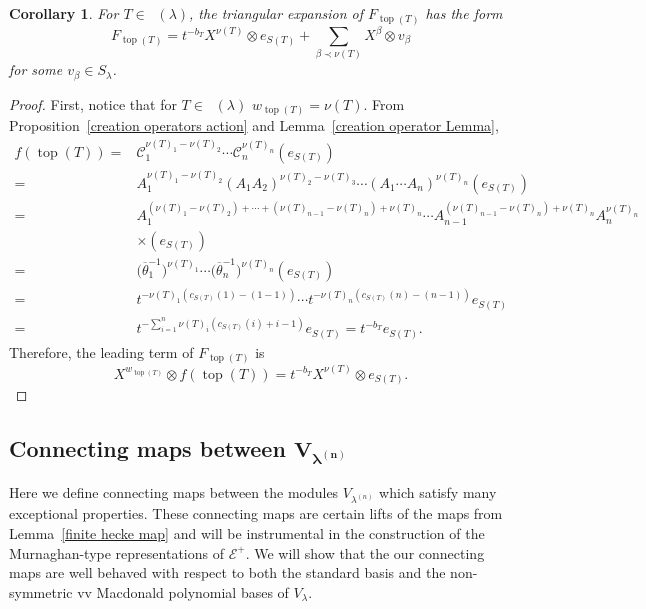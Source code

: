 \documentclass[pdftex]{sigma}
\numberwithin{equation}{section}
\newtheorem{Corollary}[Theorem]{Corollary}
\theoremstyle{definition}
\DeclareMathOperator{\RYT}{\mathrm{RYT}_{\geq 0}}
\DeclareMathOperator{\Top}{\mathrm{top}}
\begin{document}
\begin{Corollary}\label{triangular expansion of top element}
 For $T \in \RYT(\lambda)$, the triangular expansion of $F_{\Top(T)}$ has the form
 \[
 F_{\Top(T)}= t^{-b_T}X^{\nu(T)}\otimes e_{S(T)} + \sum_{\beta \prec \nu(T)} X^{\beta} \otimes v_{\beta}
 \]
 for some $v_{\beta} \in S_\lambda$.
\end{Corollary}
\begin{proof}
 First, notice that for $T \in \RYT(\lambda)$
 $w_{\Top(T)} = \nu(T)$. From Proposition~\ref{creation operators action} and Lemma~\ref{creation operator Lemma},
 \begin{align*}
 f(\Top(T)) ={}& \mathscr{C}_1^{\nu(T)_1 - \nu(T)_2}\cdots \mathscr{C}_n^{\nu(T)_n}(e_{S(T)}) \\
 ={}& A_1^{\nu(T)_1 - \nu(T)_2}(A_1A_2)^{\nu(T)_2-\nu(T)_3}\cdots (A_1\cdots A_n)^{\nu(T)_n}(e_{S(T)}) \\
 ={}& A_1^{(\nu(T)_1 - \nu(T)_2)+\cdots +(\nu(T)_{n-1}-\nu(T)_{n}) + \nu(T)_{n}}\cdots A_{n-1}^{(\nu(T)_{n-1}-\nu(T)_{n}) + \nu(T)_{n}}A_n^{\nu(T)_n}\\
 &\times (e_{S(T)}) \\
 ={}& \bigl(\overline{\theta}_1^{-1}\bigr)^{\nu(T)_1 }\cdots \bigl(\overline{\theta}_n^{-1}\bigr)^{\nu(T)_n} (e_{S(T)}) \\
 ={}& t^{-\nu(T)_1(c_{S(T)}(1)-(1-1))}\cdots t^{-\nu(T)_n(c_{S(T)}(n)-(n-1))} e_{S(T)} \\
 ={}& t^{-\sum_{i=1}^{n} \nu(T)_i( c_{S(T)}(i) + i-1)}e_{S(T)}
 = t^{-b_T} e_{S(T)}.
 \end{align*}
 Therefore, the leading term of $F_{\Top(T)}$ is
 \[
 X^{w_{\Top(T)}} \otimes f(\Top(T)) =t^{-b_T} X^{\nu(T)} \otimes e_{S(T)}.\tag*{\qed}
 \]\renewcommand{\qed}{}
\end{proof}

\subsection[Connecting maps between V\_lambda\^{}(n)]{Connecting maps between $\boldsymbol{V_{\lambda^{(n)}}}$}

Here we define connecting maps between the modules $V_{\lambda^{(n)}}$ which satisfy many exceptional properties. These connecting maps are certain lifts of the maps  from Lemma~\ref{finite hecke map} and will be instrumental in the construction of the Murnaghan-type representations of $\mathcal{E}^{+}$. We will show that the our connecting maps are well behaved with respect to both the standard basis and the non-symmetric vv Macdonald polynomial bases of $V_{\lambda}$.
\end{document}
